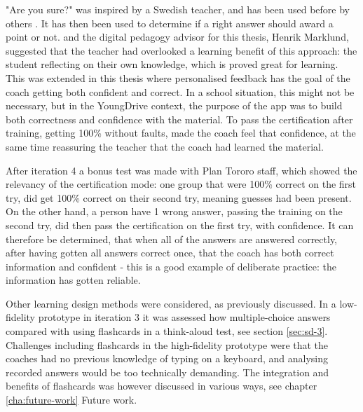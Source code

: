 
  "Are you sure?" was inspired by a Swedish teacher, and has been used before by others \citep{nicol}. It has then been used to determine if a right answer should award a point or not. \cite{nicol} and the digital pedagogy advisor for this thesis, Henrik Marklund, suggested that the teacher had overlooked a learning benefit of this approach: the student reflecting on their own knowledge, which is proved great for learning. This was extended in this thesis where personalised feedback has the goal of the coach getting both confident and correct. In a school situation, this might not be necessary, but in the YoungDrive context, the purpose of the app was to build both correctness and confidence with the material. To pass the certification after training, getting 100\% without faults, made the coach feel that confidence, at the same time reassuring the teacher that the coach had learned the material.

  After iteration 4 a bonus test was made with Plan Tororo staff, which showed the relevancy of the certification mode: one group that were 100\% correct on the first try, did get 100\% correct on their second try, meaning guesses had been present. On the other hand, a person have 1 wrong answer, passing the training on the second try, did then pass the certification on the first try, with confidence. It can therefore be determined, that when all of the answers are answered correctly, after having gotten all answers correct once, that the coach has both correct information and confident - this is a good example of deliberate practice: the information has gotten reliable.

  Other learning design methods were considered, as previously discussed. In a low-fidelity prototype in iteration 3 it was assessed how multiple-choice answers compared with using flashcards in a think-aloud test, see section \ref{sec:sd-3}. Challenges including flashcards in the high-fidelity prototype were that the coaches had no previous knowledge of typing on a keyboard, and analysing recorded answers would be too technically demanding. The integration and benefits of flashcards was however discussed in various ways, see chapter \ref{cha:future-work} Future work.
